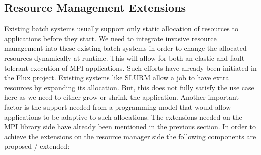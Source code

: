 \subsection{Resource Management Extensions}
Existing batch systems usually support only static allocation of resources to applications before they start. We need to integrate invasive resource management into these existing batch systems in order to change the allocated resources dynamically at runtime. This will allow for both an elastic and fault tolerant execution of MPI applications. Such efforts have already been initiated in the Flux project. Existing systems like SLURM allow a job to have extra resources by expanding its allocation. But, this does not fully satisfy the use case here as we need to either grow or shrink the application. Another important factor is the support needed from a programming model that would allow applications to be adaptive to such allocations. The extensions needed on the MPI library side have already been mentioned in the previous section. In order to achieve the extensions on the resource manager side the following components are proposed / extended:
